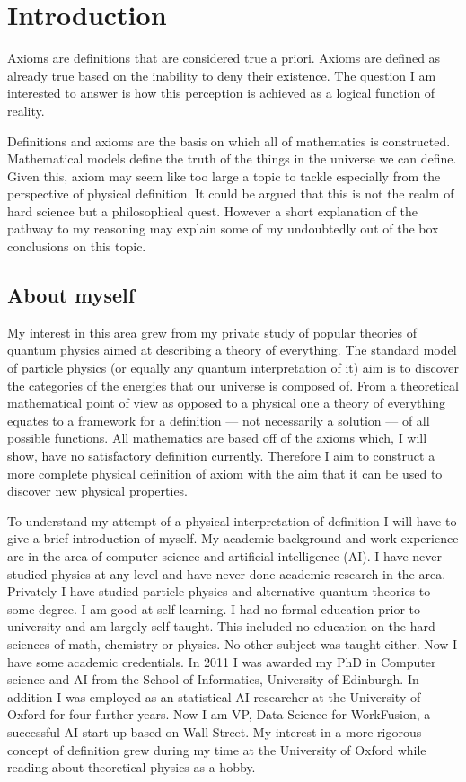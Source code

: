 	
\section{Introduction}
Axioms are definitions that are considered true a priori. Axioms are defined as already true based on the inability to deny their existence. The question I am interested to answer is how this perception is achieved as a logical function of reality. 

Definitions and axioms are the basis on which all of mathematics is constructed. Mathematical models define the truth of the things in the universe we can define. Given this, axiom may seem like too large a topic to tackle especially from the perspective of physical definition. It could be argued that this is not the realm of hard science but a philosophical quest. However a short explanation of the pathway to my reasoning may explain some of my undoubtedly out of the box conclusions on this topic. 

\subsection{About myself}
My interest in this area grew from my private study of popular theories of quantum physics aimed at describing a theory of everything. The standard model of particle physics (or equally any quantum interpretation of it) aim is to discover the categories of the energies that our universe is composed of. From a theoretical mathematical point of view as opposed to a physical one a theory of everything equates to a framework for a definition --- not necessarily a solution --- of all possible functions. All mathematics are based off of the axioms which, I will show, have no satisfactory definition currently. Therefore I aim to construct a more complete physical definition of axiom with the aim that it can be used to discover new physical properties. 

To understand my attempt of a physical interpretation  of definition I will have to give a brief introduction of myself. My academic background and work experience are in the area of computer science and artificial intelligence (AI).  I have never studied physics at any level and have never done academic research in the area. Privately I have studied particle physics and alternative quantum theories to some degree. I am good at self learning. I had no formal education prior to university and am largely self taught. This included no education on the hard sciences of math, chemistry or physics. No other subject was taught either. Now I have some academic credentials. In 2011 I was awarded my PhD in Computer science and AI from the School of Informatics, University of Edinburgh. In addition I was employed as an statistical AI researcher at the University of Oxford for four further years. Now I am VP, Data Science for WorkFusion, a successful AI start up based on Wall Street. My interest in a more rigorous concept of definition grew  during my time at the University of Oxford while reading about theoretical physics as a hobby. 

